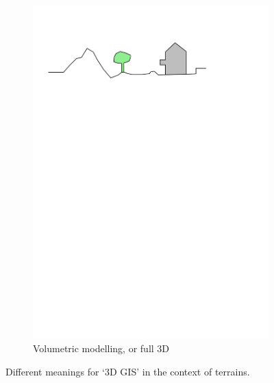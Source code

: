 \begin{figure}[b]
\begin{subfigure}[b]{0.45\linewidth}
    \includegraphics[page=4,width=\linewidth]{figs/dimgis}
    \caption{Volumetric modelling, or full 3D}
  \end{subfigure}%
  \caption{Different meanings for `3D GIS' in the context of terrains.}
\end{figure}

